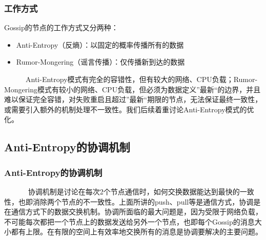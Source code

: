 \documentclass[slidestop,compress,mathserif,c]{beamer}
\begin{document}
\begin{frame}
\frametitle{工作方式}
 Gossip的节点的工作方式又分两种：
 \begin{itemize}
 \item Anti-Entropy（反熵）：以固定的概率传播所有的数据
 \item Rumor-Mongering（谣言传播）：仅传播新到达的数据
 \end{itemize}
 ~~~~~~Anti-Entropy模式有完全的容错性，但有较大的网络、CPU负载；Rumor-Mongering模式有较小的网络、CPU负载，但必须为数据定义”最新“的边界，并且难以保证完全容错，对失败重启且超过”最新“期限的节点，无法保证最终一致性，或需要引入额外的机制处理不一致性。我们后续着重讨论Anti-Entropy模式的优化。
\end{frame}

\subsection{\hfill Anti-Entropy的协调机制}
\begin{frame}
\frametitle{Anti-Entropy的协调机制}
~~~~~~ 协调机制是讨论在每次2个节点通信时，如何交换数据能达到最快的一致性，也即消除两个节点的不一致性。上面所讲的push、pull等是通信方式，协调是在通信方式下的数据交换机制。协调所面临的最大问题是，因为受限于网络负载，不可能每次都把一个节点上的数据发送给另外一个节点，也即每个Gossip的消息大小都有上限。在有限的空间上有效率地交换所有的消息是协调要解决的主要问题。
\end{frame}

\end{document}
